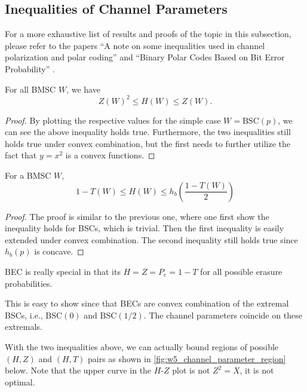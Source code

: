 \subsection{Inequalities of Channel Parameters}
For a more exhaustive list of results and proofs of the topic in this subsection, please refer to the papers ``A note on some inequalities used in channel polarization and polar coding'' \cite{Inequalities_Channel_Polarization} and ``Binary Polar Codes Based on Bit Error Probability'' \cite{Binary_PC_Bit_Err_Prob}.

\begin{theorem}
    For all BMSC $W$, we have
    \begin{equation}
        Z(W)^2\le H(W) \le Z(W).
    \end{equation}
\end{theorem}
\begin{proof}
    By plotting the respective values for the simple case $W=\mathrm{BSC}(p)$, we can see the above inequality holds true. Furthermore, the two inequalities still holds true under convex combination, but the first needs to further utilize the fact that $y=x^2$ is a convex functions.
\end{proof}
\begin{theorem}
    For a BMSC $W$,
    \begin{equation}
        1-T(W) \le H(W) \le h_b\left(\frac{1-T(W)}{2}\right)
    \end{equation}
\end{theorem}
\begin{proof}
    The proof is similar to the previous one, where one first show the inequality holds for BSCs, which is trivial. Then the first inequality is easily extended under convex combination. The second inequality still holds true since $h_b(p)$ is concave.
\end{proof}

\begin{remark}
    BEC is really special in that its $H=Z=P_e=1-T$ for all possible erasure probabilities.

    This is easy to show since that BECs are convex combination of the extremal BSCs, i.e., $\mathrm{BSC}(0)$ and $\mathrm{BSC}(1/2)$. The channel parameters coincide on these extremals.
\end{remark}

With the two inequalities above, we can actually bound regions of possible $(H,Z)$ and $(H,T)$ pairs as shown in \autoref{fig:w5_channel_parameter_region} below. Note that the upper curve in the $H$-$Z$ plot is not $Z^2=X$, it is not optimal.

